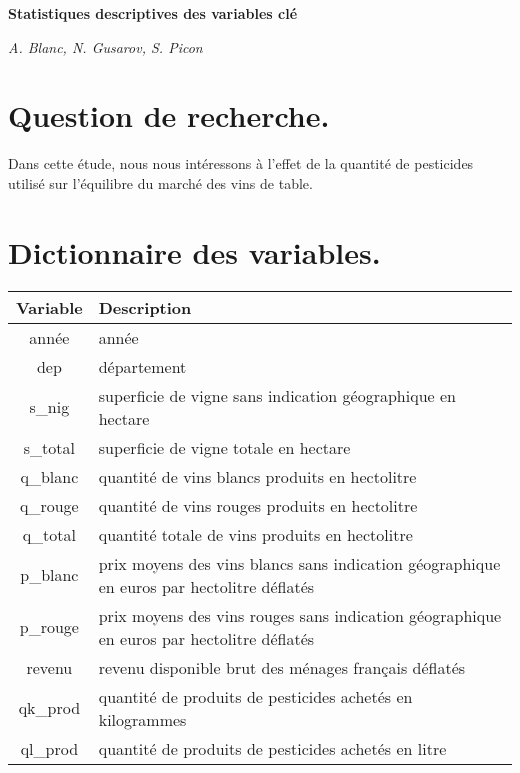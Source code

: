 \documentclass[11pt, a4paper]{article}
\begin{document}
\begin{center}
    \Large\textbf{Statistiques descriptives des variables clé}
    \par
    \large\textit{A. Blanc, N. Gusarov, S. Picon}
\end{center}

\section*{Question de recherche.}
Dans cette étude, nous nous intéressons à l’effet de la quantité de pesticides utilisé sur l’équilibre du marché des vins de table.

\section*{Dictionnaire des variables.}
\begin{tabular}{c|l}
  \hline
  Variable & Description \\
  \hline
année & année \\
dep & département \\
s\_nig & superficie de vigne sans indication géographique en hectare \\
s\_total & superficie de vigne totale en hectare \\
q\_blanc & quantité de vins blancs produits en hectolitre \\
q\_rouge & quantité de vins rouges produits en hectolitre \\
q\_total & quantité totale de vins produits en hectolitre \\
p\_blanc & prix moyens des vins blancs sans indication géographique en euros par hectolitre déflatés \\
p\_rouge & prix moyens des vins rouges sans indication géographique en euros par hectolitre déflatés \\
revenu & revenu disponible brut des ménages français déflatés \\
qk\_prod & quantité de produits de pesticides achetés en kilogrammes \\
ql\_prod & quantité de produits de pesticides achetés en litre \\
\hline
\end{tabular}
\end{document}
